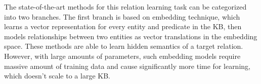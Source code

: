 


The state-of-the-art methods for this relation learning
task can be categorized into two branches.
The first branch is based on embedding technique,
which learns a vector representation for every entity and predicate in
the KB, then models relationships between two entities
as vector translations in the embedding space.
These methods are able to learn hidden semantics of a target relation.
However, with large amounts of parameters, such embedding models
require massive amount of training data and cause significantly more time for learning,
which doesn't scale to a large KB. 


